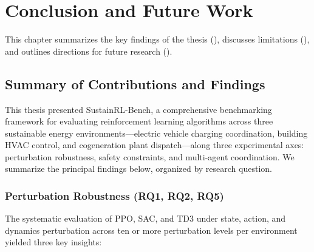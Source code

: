 \chapter{Conclusion and Future Work}
\label{ch:conclusion}

This chapter summarizes the key findings of the thesis (), discusses limitations (), and outlines directions for future research ().

\section{Summary of Contributions and Findings}
\label{sec:summary}

This thesis presented SustainRL-Bench, a comprehensive benchmarking framework for evaluating reinforcement learning algorithms across three sustainable energy environments---electric vehicle charging coordination, building HVAC control, and cogeneration plant dispatch---along three experimental axes: perturbation robustness, safety constraints, and multi-agent coordination. We summarize the principal findings below, organized by research question.

\subsection{Perturbation Robustness (RQ1, RQ2, RQ5)}

The systematic evaluation of PPO, SAC, and TD3 under state, action, and dynamics perturbation across ten or more perturbation levels per environment yielded three key insights:

